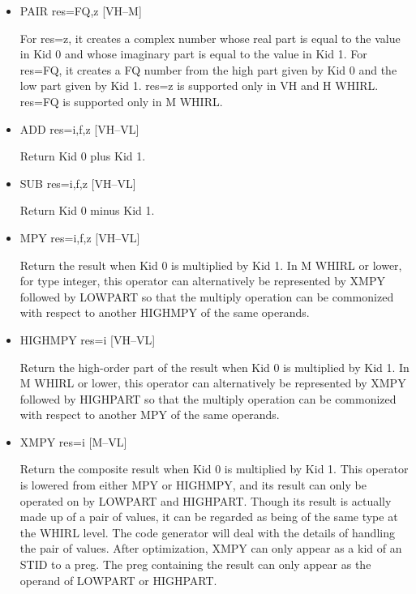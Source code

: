 \begin{itemize}

%
\item  PAIR res=FQ,z \hfill [VH--M]

For res=z, it creates a complex number whose real part is equal to
the value in Kid 0 and whose imaginary part is equal to the value
in Kid 1. For res=FQ, it creates a FQ number from the high part given by Kid
0 and the low part given by Kid 1. res=z is supported only in VH
and H WHIRL. res=FQ is supported only in M WHIRL. 

\item
{}%
ADD res=i,f,z \hfill [VH--VL]

Return Kid 0 plus Kid 1.


\item
{}%
SUB res=i,f,z \hfill [VH--VL]

Return Kid 0 minus Kid 1.

\item
{}%
MPY res=i,f,z \hfill [VH--VL]

Return the result when Kid 0 is multiplied by Kid 1. In M WHIRL
or lower, for type integer, this operator can alternatively be
represented by
%
XMPY followed by
%
LOWPART so that the multiply operation can be
commonized with respect to another
%
HIGHMPY of the same operands.

\item
{}%
HIGHMPY res=i \hfill [VH--VL]

Return the high-order part of the result when Kid 0 is multiplied
by Kid 1. In M WHIRL or lower, this operator can alternatively be
represented
by
%
XMPY followed by
%
HIGHPART so that the multiply operation can
be commonized with respect to another
%
MPY of the same operands.

\item
{}%
XMPY res=i \hfill [M--VL]

Return the composite result when Kid 0 is multiplied by Kid 1. This
operator is lowered from either
%
MPY or
%
HIGHMPY, and its result can only be operated on by
%
LOWPART
and
%
HIGHPART. Though its result is actually made up of a pair of
values, it can be regarded as being of the same type
at the WHIRL level. The code generator will deal with the details
of handling the pair of values. After optimization,
%
XMPY can only appear as a kid of an
%
STID to a preg. The preg containing
the result can only appear as the operand of
%
LOWPART or
%
HIGHPART.


\end{itemize}
